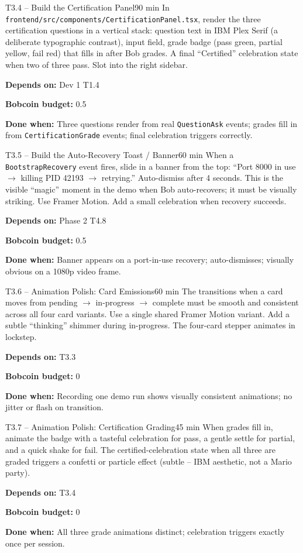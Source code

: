 \documentclass[11pt,letterpaper]{article}
\newcommand{\acceptance}[1]{\par\smallskip\textcolor{ibmgreen}{\textbf{Done when:}} #1}
\newcommand{\depends}[1]{\par\smallskip\textcolor{ibmorange}{\textbf{Depends on:}} #1}
\newcommand{\bobcost}[1]{\par\smallskip\textcolor{ibmaccent}{\textbf{Bobcoin budget:}} #1}
\begin{document}
\begin{task}{T3.4 -- Build the Certification Panel}{90 min}
In \texttt{frontend/src/components/CertificationPanel.tsx}, render the three certification questions in a vertical stack: question text in IBM Plex Serif (a deliberate typographic contrast), input field, grade badge (pass green, partial yellow, fail red) that fills in after Bob grades. A final ``Certified'' celebration state when two of three pass. Slot into the right sidebar.
\depends{Dev 1 T1.4}
\bobcost{0.5}
\acceptance{Three questions render from real \texttt{QuestionAsk} events; grades fill in from \texttt{CertificationGrade} events; final celebration triggers correctly.}
\end{task}

\begin{task}{T3.5 -- Build the Auto-Recovery Toast / Banner}{60 min}
When a \texttt{BootstrapRecovery} event fires, slide in a banner from the top: ``Port 8000 in use $\rightarrow$ killing PID 42193 $\rightarrow$ retrying.'' Auto-dismiss after 4 seconds. This is the visible ``magic'' moment in the demo when Bob auto-recovers; it must be visually striking. Use Framer Motion. Add a small celebration when recovery succeeds.
\depends{Phase 2 T4.8}
\bobcost{0.5}
\acceptance{Banner appears on a port-in-use recovery; auto-dismisses; visually obvious on a 1080p video frame.}
\end{task}

\begin{task}{T3.6 -- Animation Polish: Card Emissions}{60 min}
The transitions when a card moves from pending $\rightarrow$ in-progress $\rightarrow$ complete must be smooth and consistent across all four card variants. Use a single shared Framer Motion variant. Add a subtle ``thinking'' shimmer during in-progress. The four-card stepper animates in lockstep.
\depends{T3.3}
\bobcost{0}
\acceptance{Recording one demo run shows visually consistent animations; no jitter or flash on transition.}
\end{task}

\begin{task}{T3.7 -- Animation Polish: Certification Grading}{45 min}
When grades fill in, animate the badge with a tasteful celebration for pass, a gentle settle for partial, and a quick shake for fail. The certified-celebration state when all three are graded triggers a confetti or particle effect (subtle -- IBM aesthetic, not a Mario party).
\depends{T3.4}
\bobcost{0}
\acceptance{All three grade animations distinct; celebration triggers exactly once per session.}
\end{task}
\end{document}
